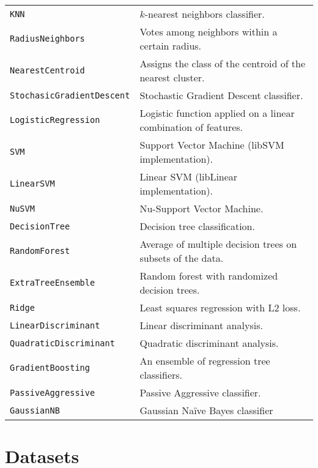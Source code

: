 \begin{tabularx}{\textwidth}{l X}
\texttt{KNN} & $k$-nearest neighbors classifier.\\
\texttt{RadiusNeighbors} & Votes among neighbors within a certain radius. \\
\texttt{NearestCentroid} & Assigns the class of the centroid of the nearest cluster.\\
\texttt{StochasicGradientDescent} & Stochastic Gradient Descent classifier.\\
\texttt{LogisticRegression} & Logistic function applied on a linear combination of features.\\
\texttt{SVM} & Support Vector Machine (libSVM implementation).\\
\texttt{LinearSVM} & Linear SVM (libLinear implementation).\\
\texttt{NuSVM} & Nu-Support Vector Machine.\\
\texttt{DecisionTree} & Decision tree classification.\\
\texttt{RandomForest} & Average of multiple decision trees on subsets of the data.\\
\texttt{ExtraTreeEnsemble} & Random forest with randomized decision trees.\\
\texttt{Ridge} & Least squares regression with L2 loss.\\
\texttt{LinearDiscriminant} & Linear discriminant analysis.\\
\texttt{QuadraticDiscriminant} & Quadratic discriminant analysis.\\
\texttt{GradientBoosting} & An ensemble of regression tree classifiers.\\
\texttt{PassiveAggressive} & Passive Aggressive classifier.\\
\texttt{GaussianNB} & Gaussian Na\"ive Bayes classifier\\
\end{tabularx}


\chapter{Datasets}

